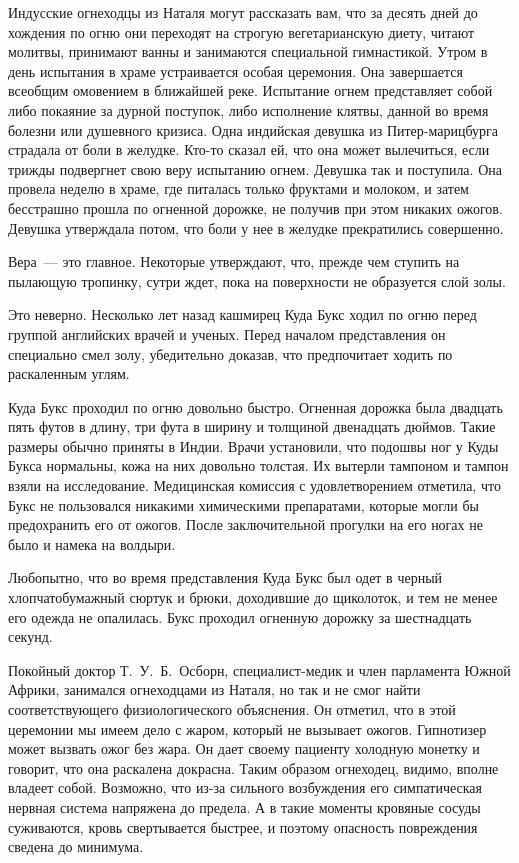 \documentclass[12pt,a4paper,twoside,openany,svgnames]{memoir}
\begin{document}
Индусские огнеходцы из Наталя могут рассказать вам, что за десять дней до хождения по огню они переходят на строгую вегетарианскую диету, читают молитвы, принимают ванны и занимаются специальной гимнастикой. Утром в день испытания в храме устраивается особая церемония. Она завершается всеобщим омовением в ближайшей реке. Испытание огнем представляет собой либо покаяние за дурной поступок, либо исполнение клятвы, данной во время болезни или душевного кризиса. Одна индийская девушка из Питер-марицбурга страдала от боли в желудке. Кто-то сказал ей, что она может вылечиться, если трижды подвергнет свою веру испытанию огнем. Девушка так и поступила. Она провела неделю в храме, где питалась только фруктами и молоком, и затем бесстрашно прошла по огненной дорожке, не получив при этом никаких ожогов. Девушка утверждала потом, что боли у нее в желудке прекратились совершенно.

Вера~--- это главное. Некоторые утверждают, что, прежде чем ступить на пылающую тропинку, сутри ждет, пока на поверхности не образуется слой золы.

Это неверно. Несколько лет назад кашмирец Куда Букс ходил по огню перед группой английских врачей и ученых. Перед началом представления он специально смел золу, убедительно доказав, что предпочитает ходить по раскаленным углям.

Куда Букс проходил по огню довольно быстро. Огненная дорожка была двадцать пять футов в длину, три фута в ширину и толщиной двенадцать дюймов. Такие размеры обычно приняты в Индии. Врачи установили, что подошвы ног у Куды Букса нормальны, кожа на них довольно толстая. Их вытерли тампоном и тампон взяли на исследование. Медицинская комиссия с удовлетворением отметила, что Букс не пользовался никакими химическими препаратами, которые могли бы предохранить его от ожогов. После заключительной прогулки на его ногах не было и намека на волдыри.

Любопытно, что во время представления Куда Букс был одет в черный хлопчатобумажный сюртук и брюки, доходившие до щиколоток, и тем не менее его одежда не опалилась. Букс проходил огненную дорожку за шестнадцать секунд.

Покойный доктор Т.~У.~Б.~Осборн, специалист-медик и член парламента Южной Африки, занимался огнеходцами из Наталя, но так и не смог найти соответствующего физиологического объяснения. Он отметил, что в этой церемонии мы имеем дело с жаром, который не вызывает ожогов. Гипнотизер может вызвать ожог без жара. Он дает своему пациенту холодную монетку и говорит, что она раскалена докрасна. Таким образом огнеходец, видимо, вполне владеет собой. Возможно, что из-за сильного возбуждения его симпатическая нервная система напряжена до предела. А в такие моменты кровяные сосуды суживаются, кровь свертывается быстрее, и поэтому опасность повреждения сведена до минимума.
\end{document}
